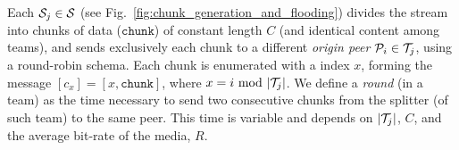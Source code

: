 \begin{figure*}
  \caption{Chunk generation and
    flooding.\label{fig:chunk_generation_and_flooding}}
\end{figure*}
Each ${\cal S}_j\in{\cal S}$ (see
Fig.~\ref{fig:chunk_generation_and_flooding}) divides the stream into
chunks of data ($\mathtt{chunk}$) of constant length $C$ (and
identical content among teams), and sends exclusively each chunk to a
different \emph{origin peer} ${\cal P}_i\in{\cal T}_j$, using a
round-robin schema. Each chunk is enumerated with a index $x$, forming
the message $[c_x]=[x,\mathtt{chunk}]$, where
$x=i~\mathrm{mod}~|{\cal T}_j|$. We define a \emph{round} (in a team)
as the time necessary to send two consecutive chunks from the splitter
(of such team) to the same peer. This time is variable and depends on
$|{\cal T}_j|$, $C$, and the average bit-rate of the media, $R$.

\begin{comment}
The round-time is defined by:
\begin{equation}
  \cal{r} = \cal{c}N.
  \label{eq:round_time}
\end{equation}
For example, if we use only one team of $N=256$ peers, a chunk size
$C=1024$~bytes, and a video of $1$~Mb/s, the round time is
\begin{displaymath}
  \cal{r} = \frac{1024\frac{\text{bytes}}{\text{chunk}}\times
    8\frac{\text{bits}}{\text{byte}}}{10^6\frac{\text{bits}}{\text{second}}}\times
  256 \approx 2.1~\text{seconds}.
\end{displaymath}
\end{comment}
